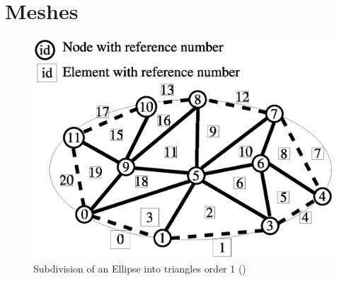 \section{Meshes}
\label{FINLEY MESHES}

\begin{figure}
\centerline{\includegraphics{FinleyMesh}}
\caption{Subdivision of an Ellipse into triangles order 1 ()}
\label{FINLEY FIG 0}
\end{figure}

